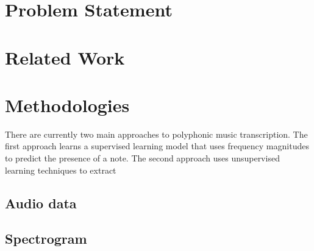 \documentclass[5p]{elsarticle}
\begin{document}
















\section{Problem Statement}

\section{Related Work}


\section{Methodologies}
There are currently two main approaches to polyphonic music transcription. The first approach learns a supervised learning model that uses frequency magnitudes to predict the presence of a note. The second approach uses unsupervised learning techniques to extract 

\subsection{Audio data}


\subsection{Spectrogram}
\end{document}
